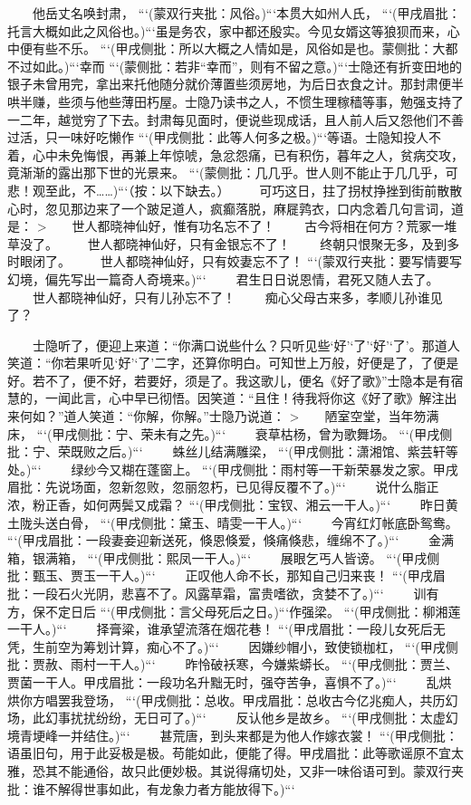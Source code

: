 \documentclass[
    ref = refDemo.bib,
    coverpage = cover.pdf,
    geometry = b5,
    lang = cn
]{spBook}
\begin{document}
    　　他岳丈名唤封肃， ```(蒙双行夹批：风俗。)```本贯大如州人氏， ```(甲戌眉批：托言大概如此之风俗也。)```虽是务农，家中都还殷实。今见女婿这等狼狈而来，心中便有些不乐。 ```(甲戌侧批：所以大概之人情如是，风俗如是也。蒙侧批：大都不过如此。)```幸而 ```(蒙侧批：若非“幸而”，则有不留之意。)```士隐还有折变田地的银子未曾用完，拿出来托他随分就价薄置些须房地，为后日衣食之计。那封肃便半哄半赚，些须与他些薄田朽屋。士隐乃读书之人，不惯生理稼穑等事，勉强支持了一二年，越觉穷了下去。封肃每见面时，便说些现成话，且人前人后又怨他们不善过活，只一味好吃懒作 ```(甲戌侧批：此等人何多之极。)```等语。士隐知投人不着，心中未免悔恨，再兼上年惊唬，急忿怨痛，已有积伤，暮年之人，贫病交攻，竟渐渐的露出那下世的光景来。 ```(蒙侧批：几几乎。世人则不能止于几几乎，可悲！观至此，不……)```（按：以下缺去。）  
    　　可巧这日，拄了拐杖挣挫到街前散散心时，忽见那边来了一个跛足道人，疯癫落脱，麻屣鹑衣，口内念着几句言词，道是：  
    >　　世人都晓神仙好，惟有功名忘不了！  
    　　古今将相在何方？荒冢一堆草没了。  
    　　世人都晓神仙好，只有金银忘不了！  
    　　终朝只恨聚无多，及到多时眼闭了。  
    　　世人都晓神仙好，只有姣妻忘不了！ ```(蒙双行夹批：要写情要写幻境，偏先写出一篇奇人奇境来。)```  
    　　君生日日说恩情，君死又随人去了。
    　　世人都晓神仙好，只有儿孙忘不了！
    　　痴心父母古来多，孝顺儿孙谁见了？

    　　士隐听了，便迎上来道：“你满口说些什么？只听见些‘好’‘了’‘好’‘了’。那道人笑道：“你若果听见‘好’‘了’二字，还算你明白。可知世上万般，好便是了，了便是好。若不了，便不好，若要好，须是了。我这歌儿，便名《好了歌》”士隐本是有宿慧的，一闻此言，心中早已彻悟。因笑道：“且住！待我将你这《好了歌》解注出来何如？”道人笑道：“你解，你解。”士隐乃说道：  
    >　　陋室空堂，当年笏满床， ```(甲戌侧批：宁、荣未有之先。)```  
    　　衰草枯杨，曾为歌舞场。 ```(甲戌侧批：宁、荣既败之后。)```  
    　　蛛丝儿结满雕梁， ```(甲戌侧批：潇湘馆、紫芸轩等处。)```  
    　　绿纱今又糊在蓬窗上。 ```(甲戌侧批：雨村等一干新荣暴发之家。甲戌眉批：先说场面，忽新忽败，忽丽忽朽，已见得反覆不了。)```  
    　　说什么脂正浓，粉正香，如何两鬓又成霜？ ```(甲戌侧批：宝钗、湘云一干人。)```  
    　　昨日黄土陇头送白骨， ```(甲戌侧批：黛玉、晴雯一干人。)```  
    　　今宵红灯帐底卧鸳鸯。 ```(甲戌眉批：一段妻妾迎新送死，倏恩倏爱，倏痛倏悲，缠绵不了。)```  
    　　金满箱，银满箱， ```(甲戌侧批：熙凤一干人。)```  
    　　展眼乞丐人皆谤。 ```(甲戌侧批：甄玉、贾玉一干人。)```  
    　　正叹他人命不长，那知自己归来丧！ ```(甲戌眉批：一段石火光阴，悲喜不了。风露草霜，富贵嗜欲，贪婪不了。)```  
    　　训有方，保不定日后 ```(甲戌侧批：言父母死后之日。)```作强梁。 ```(甲戌侧批：柳湘莲一干人。)```  
    　　择膏粱，谁承望流落在烟花巷！ ```(甲戌眉批：一段儿女死后无凭，生前空为筹划计算，痴心不了。)```  
    　　因嫌纱帽小，致使锁枷杠， ```(甲戌侧批：贾赦、雨村一干人。)```  
    　　昨怜破袄寒，今嫌紫蟒长。 ```(甲戌侧批：贾兰、贾菌一干人。甲戌眉批：一段功名升黜无时，强夺苦争，喜惧不了。)```  
    　　乱烘烘你方唱罢我登场， ```(甲戌侧批：总收。甲戌眉批：总收古今亿兆痴人，共历幻场，此幻事扰扰纷纷，无日可了。)```  
    　　反认他乡是故乡。 ```(甲戌侧批：太虚幻境青埂峰一并结住。)```  
    　　甚荒唐，到头来都是为他人作嫁衣裳！ ```(甲戌侧批：语虽旧句，用于此妥极是极。苟能如此，便能了得。甲戌眉批：此等歌谣原不宜太雅，恐其不能通俗，故只此便妙极。其说得痛切处，又非一味俗语可到。蒙双行夹批：谁不解得世事如此，有龙象力者方能放得下。)```  
\end{document}
